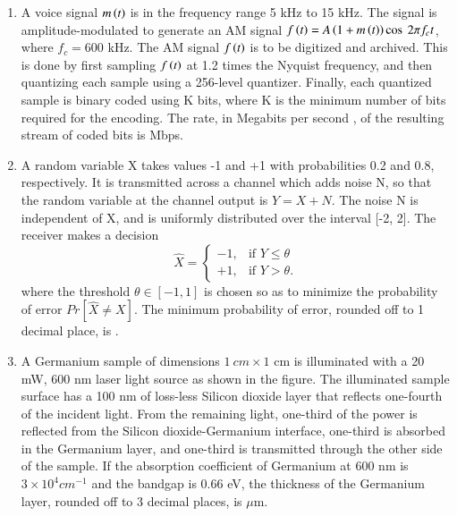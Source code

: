 \documentclass[a4paper, 11pt]{article}
\begin{document}
\begin{enumerate}
    \hfill{}
    
    \item A voice signal $m\left(t\right)$ is in the frequency range 5 kHz to 15 kHz. The signal is amplitude-modulated to generate an AM signal $f\left(t\right)=A\left(1+m\left(t\right)\right)\cos~2\pi f_{c}t$, where $f_{c}=600$ kHz. The AM signal $f\left(t\right)$ is to be digitized and archived. This is done by first sampling $f\left(t\right)$ at 1.2 times the Nyquist frequency, and then quantizing each sample using a 256-level quantizer. Finally, each quantized sample is binary coded using K bits, where K is the minimum number of bits required for the encoding. The rate, in Megabits per second , of the resulting stream of coded bits is \underline{\hspace{2cm}} Mbps.
    
    \hfill{}
    
    \item A random variable X takes values -1 and +1 with probabilities 0.2 and 0.8, respectively. It is transmitted across a channel which adds noise N, so that the random variable at the channel output is $Y=X+N$. The noise N is independent of X, and is uniformly distributed over the interval [-2, 2]. The receiver makes a decision
    \[
    \hat{X}=
    \begin{cases}
        -1, & \text{if } Y\le\theta\\
        +1, & \text{if } Y>\theta.
    \end{cases}
    \]
    where the threshold $\theta\in[-1,1]$ is chosen so as to minimize the probability of error $Pr[\hat{X}\ne X]$. The minimum probability of error, rounded off to 1 decimal place, is \underline{\hspace{2cm}}.
    
    \hfill{}
    
    \item A Germanium sample of dimensions $1~cm\times1$ cm is illuminated with a 20 mW, 600 nm laser light source as shown in the figure. The illuminated sample surface has a 100 nm of loss-less Silicon dioxide layer that reflects one-fourth of the incident light. From the remaining light, one-third of the power is reflected from the Silicon dioxide-Germanium interface, one-third is absorbed in the Germanium layer, and one-third is transmitted through the other side of the sample. If the absorption coefficient of Germanium at 600 nm is $3\times10^{4}cm^{-1}$ and the bandgap is 0.66 eV, the thickness of the Germanium layer, rounded off to 3 decimal places, is \underline{\hspace{2cm}} $\mu$m.
    

\end{enumerate}
\end{document}
